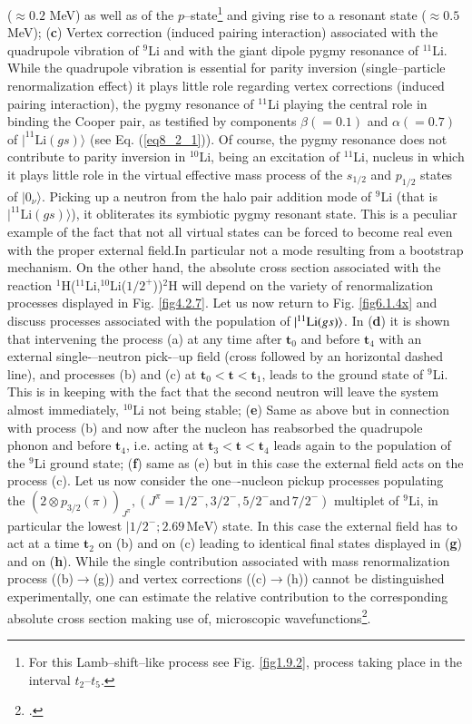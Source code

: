 ($\approx 0.2$ MeV) as well as of the $p$--state\footnote{For this Lamb--shift--like process see Fig. \ref{fig1.9.2}, process taking place in the interval $t_2$--$t_5$.} and giving rise to a resonant state ($\approx0.5$ MeV);  (\textbf{c}) Vertex correction (induced pairing interaction) associated with the quadrupole vibration of $^9$Li and with the giant dipole pygmy resonance of $^{11}$Li. While the quadrupole vibration is essential for parity inversion (single--particle renormalization effect) it plays little role regarding vertex corrections (induced pairing interaction), the pygmy resonance of $^{11}$Li playing the central role in binding the Cooper pair, as testified by components $\beta(=0.1)$ and $\alpha(=0.7)$ of $|^{11}\text{Li}(gs)\rangle$ (see Eq. (\ref{eq8_2_1})). Of course, the pygmy resonance does not contribute to parity inversion in $^{10}$Li, being an excitation of $^{11}$Li, nucleus in which it plays little role in the virtual effective mass process of the $s_{1/2}$ and $p_{1/2}$ states of $|0_\nu\rangle$. Picking up a neutron from the halo pair addition mode of $^9$Li (that is $|^{11}\text{Li}(gs)\rangle$), it obliterates its symbiotic pygmy resonant state. This is  a peculiar example of the fact that not all virtual states can be forced to become real even with the proper external field.In particular not a mode resulting from a bootstrap mechanism. On the other hand, the absolute cross section associated with the reaction  $^1$H($^{11}$Li,$^{10}$Li($1/2^+$))$^2$H will depend on the variety of renormalization processes displayed in Fig. \ref{fig4.2.7}.  Let us now return to Fig. \ref{fig6.1.4x} and discuss processes associated with the population of $|{^{11}\text{Li}(gs)} \rangle$. In (\textbf{d}) it is shown that intervening the process (a) at any time after
$\mathbf{t}_0$ and before $\mathbf{t}_4$ with an external single-–neutron pick-–up field (cross followed by an horizontal dashed line), and processes (b) and (c) at $\mathbf{t}_0<\mathbf{t}<\mathbf{t}_1$, 
 leads to the ground state of $^9$Li. This is in keeping with the fact that the second neutron will leave the system
almost immediately, $^{10}$Li not being stable; (\textbf{e}) Same as above but in connection with process (b) and now after the nucleon has reabsorbed
the quadrupole phonon and before $\mathbf{t}_4$, i.e. acting at $\mathbf{t}_3<\mathbf{t}<\mathbf{t}_4$ leads again to the population of the $^9$Li ground state; (\textbf{f}) same as (e) but in this case the external field acts on the process (c). Let us now consider
the one–-nucleon pickup processes populating the $(2\otimes p_{3/2}(\pi))_{J^{\pi}}, (J^{\pi}=1/2^-,3/2^-,5/2^-\text{and}\, 7/2^-)$ multiplet of $^9$Li, in particular the lowest
$|1/2^-;2.69\, \text{MeV}\rangle$ state. In this case the external field has to act at a time $\mathbf{t}_2$ on (b) and on (c) leading to  identical final states displayed in (\textbf{g}) and on (\textbf{h}). While
the single contribution associated with mass renormalization process ((b)$\rightarrow$(g)) and vertex corrections ((c)$\rightarrow$(h)) cannot be 
distinguished experimentally, one can estimate the relative contribution to the corresponding absolute cross section making use of, microscopic wavefunctions\footnote{\cite{Barranco:01}.}.


